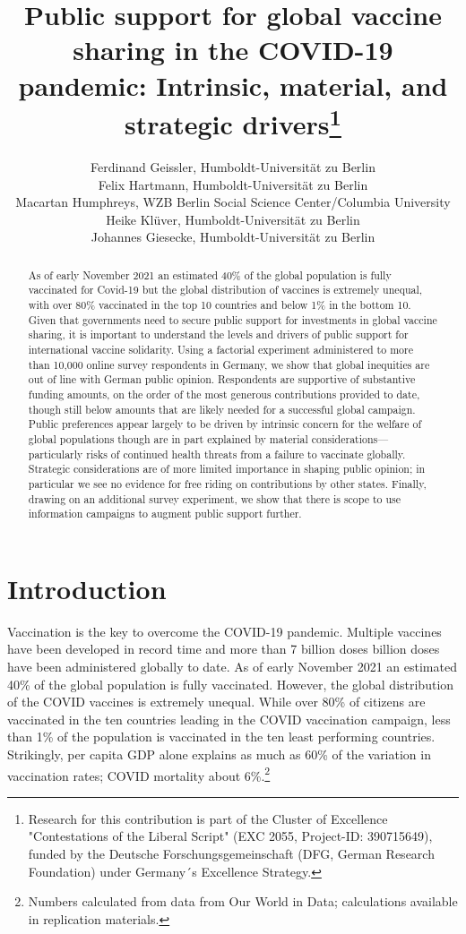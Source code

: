 \documentclass[]{article}
\title{Public support for global vaccine sharing in the COVID-19 pandemic: Intrinsic, material, and strategic drivers\footnote{Research for this contribution is part of the Cluster of Excellence "Contestations of the Liberal Script" (EXC 2055, Project-ID: 390715649), funded by the Deutsche Forschungsgemeinschaft (DFG, German Research Foundation) under Germany´s Excellence Strategy.}}
\author{Ferdinand Geissler, Humboldt-Universität zu Berlin \\
	Felix Hartmann, Humboldt-Universität zu Berlin \\ 
	Macartan Humphreys, WZB Berlin Social Science Center/Columbia University \\
	Heike Klüver, Humboldt-Universität zu Berlin \\
	Johannes Giesecke, Humboldt-Universität zu Berlin
}
\begin{document}
\maketitle

\begin{abstract}
As of early November 2021 an estimated 40\% of the global population is fully vaccinated for Covid-19 but the global distribution of vaccines is extremely unequal, with over 80\% vaccinated in the top 10 countries and below 1\% in the bottom 10. Given that governments need to secure public support for investments in global vaccine sharing, it is important to understand the levels and drivers of public support for international vaccine solidarity. Using a  factorial experiment administered to more than 10,000 online survey respondents in Germany, we show that global inequities are out of line with German public opinion. Respondents are supportive of substantive funding amounts, on the order of the most generous contributions provided to date, though still below amounts that are likely needed for a successful global campaign. Public preferences appear largely to be driven by intrinsic concern for the welfare of global populations though are in part explained by material considerations---particularly risks of continued health threats from a failure to vaccinate globally. Strategic considerations are of more limited importance in shaping public opinion; in particular we see no evidence for free riding on contributions by other states. Finally, drawing on an additional survey experiment, we show that there is scope to use information campaigns to augment public support further.   
\end{abstract}


\newpage


\section{Introduction}

Vaccination is the key to overcome the COVID-19 pandemic. Multiple vaccines have been developed in record time and more than 7 billion doses billion doses have been administered globally to date.  %
As of early November 2021 an estimated 40\% of the global population is fully vaccinated. However, the global distribution of the COVID vaccines is extremely unequal. While over 80\% of citizens are vaccinated in the ten countries leading in the COVID vaccination campaign, less than 1\% of the population is vaccinated in the ten least performing countries. Strikingly, per capita GDP alone explains as much as  60\% of the variation in vaccination rates; COVID mortality about 6\%.\footnote{Numbers calculated from data from Our World in Data; calculations available in replication materials.}  
\end{document}
